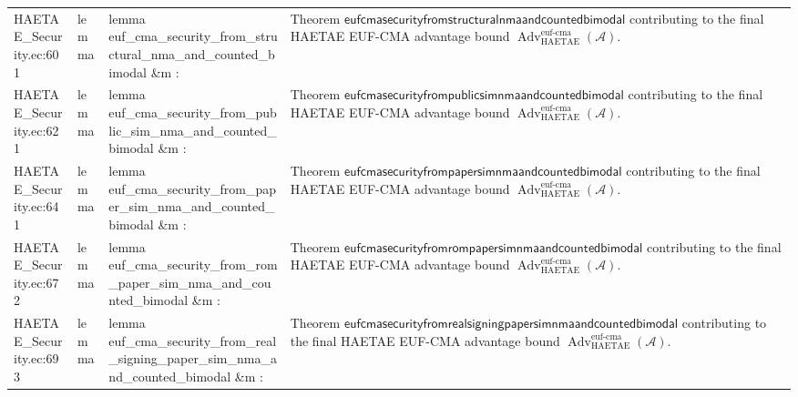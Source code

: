 \documentclass[10pt]{article}
\newcommand{\Adv}{\operatorname{Adv}}
\begin{document}
\begin{longtable}{L{0.11\textwidth}L{0.055\textwidth}L{0.385\textwidth}L{0.41\textwidth}}
HAETAE\_\allowbreak{}Security.\allowbreak{}ec:\allowbreak{}601 & lemma & {\ttfamily\scriptsize lemma euf\_\allowbreak{}cma\_\allowbreak{}security\_\allowbreak{}from\_\allowbreak{}structural\_\allowbreak{}nma\_\allowbreak{}and\_\allowbreak{}counted\_\allowbreak{}bimodal \&m :} & Theorem $\mathsf{eufcmasecurityfromstructuralnmaandcountedbimodal}$ contributing to the final HAETAE EUF-CMA advantage bound $\Adv_{\mathrm{HAETAE}}^{\mathrm{euf\mbox{-}cma}}(\mathcal A)$. \\
HAETAE\_\allowbreak{}Security.\allowbreak{}ec:\allowbreak{}621 & lemma & {\ttfamily\scriptsize lemma euf\_\allowbreak{}cma\_\allowbreak{}security\_\allowbreak{}from\_\allowbreak{}public\_\allowbreak{}sim\_\allowbreak{}nma\_\allowbreak{}and\_\allowbreak{}counted\_\allowbreak{}bimodal \&m :} & Theorem $\mathsf{eufcmasecurityfrompublicsimnmaandcountedbimodal}$ contributing to the final HAETAE EUF-CMA advantage bound $\Adv_{\mathrm{HAETAE}}^{\mathrm{euf\mbox{-}cma}}(\mathcal A)$. \\
HAETAE\_\allowbreak{}Security.\allowbreak{}ec:\allowbreak{}641 & lemma & {\ttfamily\scriptsize lemma euf\_\allowbreak{}cma\_\allowbreak{}security\_\allowbreak{}from\_\allowbreak{}paper\_\allowbreak{}sim\_\allowbreak{}nma\_\allowbreak{}and\_\allowbreak{}counted\_\allowbreak{}bimodal \&m :} & Theorem $\mathsf{eufcmasecurityfrompapersimnmaandcountedbimodal}$ contributing to the final HAETAE EUF-CMA advantage bound $\Adv_{\mathrm{HAETAE}}^{\mathrm{euf\mbox{-}cma}}(\mathcal A)$. \\
HAETAE\_\allowbreak{}Security.\allowbreak{}ec:\allowbreak{}672 & lemma & {\ttfamily\scriptsize lemma euf\_\allowbreak{}cma\_\allowbreak{}security\_\allowbreak{}from\_\allowbreak{}rom\_\allowbreak{}paper\_\allowbreak{}sim\_\allowbreak{}nma\_\allowbreak{}and\_\allowbreak{}counted\_\allowbreak{}bimodal \&m :} & Theorem $\mathsf{eufcmasecurityfromrompapersimnmaandcountedbimodal}$ contributing to the final HAETAE EUF-CMA advantage bound $\Adv_{\mathrm{HAETAE}}^{\mathrm{euf\mbox{-}cma}}(\mathcal A)$. \\
HAETAE\_\allowbreak{}Security.\allowbreak{}ec:\allowbreak{}693 & lemma & {\ttfamily\scriptsize lemma euf\_\allowbreak{}cma\_\allowbreak{}security\_\allowbreak{}from\_\allowbreak{}real\_\allowbreak{}signing\_\allowbreak{}paper\_\allowbreak{}sim\_\allowbreak{}nma\_\allowbreak{}and\_\allowbreak{}counted\_\allowbreak{}bimodal \&m :} & Theorem $\mathsf{eufcmasecurityfromrealsigningpapersimnmaandcountedbimodal}$ contributing to the final HAETAE EUF-CMA advantage bound $\Adv_{\mathrm{HAETAE}}^{\mathrm{euf\mbox{-}cma}}(\mathcal A)$. \\

\end{longtable}
\end{document}
